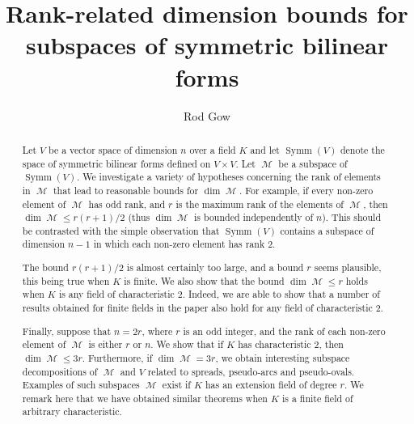 \documentclass{amsart}
\DeclareMathOperator{\M}{\mathcal{M}}
\DeclareMathOperator{\Symm}{Symm}
\theoremstyle{plain}
\theoremstyle{definition}
\begin{document}
\title[Rank properties of subspaces]
{Rank-related dimension bounds for    \\ 
subspaces of symmetric bilinear forms}



\author[R. Gow]{Rod Gow}
\address{School of Mathematics and Statistics\\
University College Dublin\\
 Ireland}




\begin{abstract} 

Let $V$ be a vector space of dimension $n$ over a field $K$ and 
let $\Symm(V)$ denote the space of symmetric bilinear forms defined on $V\times V$. Let $\M$ be a subspace of $\Symm(V)$.
We investigate a variety
of hypotheses concerning the rank of elements in $\M$ that lead to reasonable bounds for $\dim \M$. For example, if every non-zero element of 
$\M$ has odd rank, and $r$ is the maximum rank of the elements of $\M$, then $\dim \M\leq r(r+1)/2$ (thus $\dim \M$ is bounded independently of $n$).
This should be contrasted with the simple observation that $\Symm(V)$ contains a subspace of dimension $n-1$ in which each non-zero element
has rank $2$. 

The bound $r(r+1)/2$ is almost certainly too large, and a bound $r$ seems plausible, this being true when $K$ is finite.
We also show that the bound $\dim \M\leq r$ holds when $K$ is any field of characteristic 2. Indeed, we are able to show that a number
of results obtained for finite fields in the paper \cite{Gow2} also hold for any field of characteristic 2. 

Finally, suppose that $n=2r$, where $r$ is an odd integer, and the rank of each non-zero
element of $\M$ is either $r$ or $n$. We show that if $K$ has characteristic 2, then $\dim \M\leq 3r$. Furthermore, if $\dim \M=3r$, we obtain
interesting subspace decompositions of $\M$ and $V$ related to spreads, pseudo-arcs and pseudo-ovals.
Examples of such subspaces $\M$ exist if $K$ has an extension field
of degree $r$. We remark here that we have obtained similar theorems when $K$ is a finite field of arbitrary characteristic.



\end{abstract}
\maketitle
\end{document}
